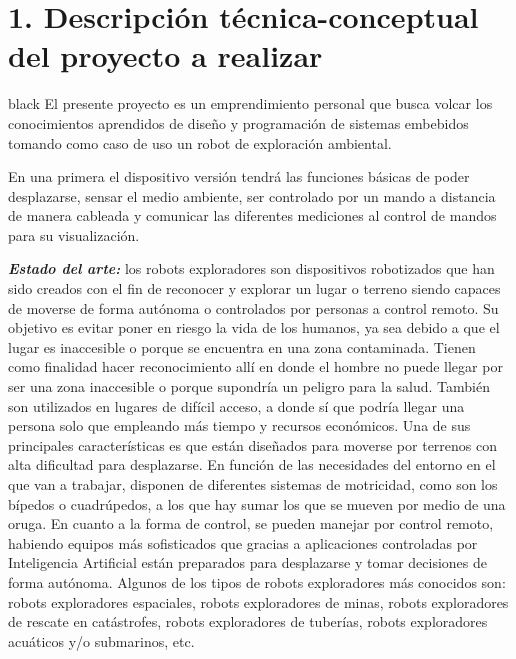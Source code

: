 \documentclass[
11pt, %
codirector, %
]{charter}
\begin{document}
\section{1. Descripción técnica-conceptual del proyecto a realizar}
\label{sec:descripcion}

\begin{consigna}{black} %
El presente proyecto es un emprendimiento personal que busca volcar los conocimientos aprendidos de diseño y programación de sistemas embebidos tomando como caso de uso un robot de exploración ambiental. 

En una primera el dispositivo versión tendrá las funciones básicas de poder desplazarse, sensar el medio ambiente, ser controlado por un mando a distancia de manera cableada y comunicar las diferentes mediciones al control de mandos para su visualización.


\textit{\textbf{Estado del arte:}}
los robots exploradores son dispositivos robotizados que han sido creados con el fin de reconocer y explorar un lugar o terreno siendo capaces de moverse de forma autónoma o controlados por personas a control remoto. Su objetivo es evitar poner en riesgo la vida de los humanos, ya sea debido a que el lugar es inaccesible o porque se encuentra en una zona contaminada.
Tienen como finalidad hacer reconocimiento allí en donde el hombre no puede llegar por ser una zona inaccesible o porque supondría un peligro para la salud. También son utilizados en lugares de difícil acceso, a donde sí que podría llegar una persona solo que empleando más tiempo y recursos económicos.
Una de sus principales características es que están diseñados para moverse por terrenos con alta dificultad para desplazarse. En función de las necesidades del entorno en el que van a trabajar, disponen de diferentes sistemas de motricidad, como son los bípedos o cuadrúpedos, a los que hay sumar los que se mueven por medio de una oruga.
En cuanto a la forma de control, se pueden manejar por control remoto, habiendo equipos más sofisticados que gracias a aplicaciones controladas por Inteligencia Artificial están preparados para desplazarse y tomar decisiones de forma autónoma.
Algunos de los tipos de robots exploradores más conocidos son: robots exploradores espaciales, robots exploradores de minas, robots exploradores de rescate en catástrofes, robots exploradores de tuberías, robots exploradores acuáticos y/o submarinos, etc.


\end{consigna}
\end{document}
